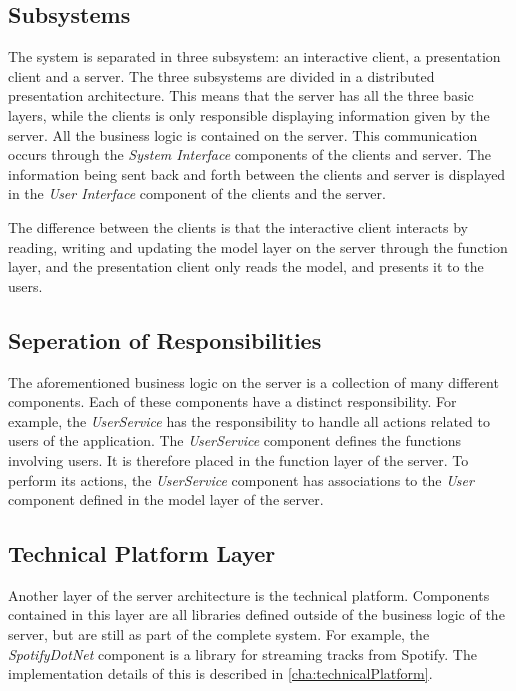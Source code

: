 \subsection{Subsystems}
The system is separated in three subsystem: an interactive client, a presentation client and a server. The three subsystems are divided in a distributed presentation architecture. This means that the server has all the three basic layers, while the clients is only responsible displaying information given by the server. All the business logic is contained on the
server. This communication occurs through the \textit{System Interface}
components of the clients and server. The information being sent back and
forth between the clients and server is displayed in the \textit{User Interface}
component of the clients and the server.

The difference between the clients is that the interactive client interacts by reading, writing and updating the model layer on the server through the function layer, and the presentation client only reads the model, and presents it to the users.

\subsection{Seperation of Responsibilities}
The aforementioned business logic on the server is a collection of
many different components. Each of these components have a distinct
responsibility. For example, the \textit{UserService} has the responsibility to
handle all actions related to users of the application. The
\textit{UserService} component defines the functions involving users. It is
therefore placed in the function layer of the server. To perform its
actions, the \textit{UserService} component has associations to the \textit{User}
component defined in the model layer of the server.

\subsection{Technical Platform Layer}

Another layer of the server architecture is the
technical platform. Components contained in this layer are all
libraries defined outside of the business logic of the server, but are
still as part of the complete system. For example, the
\textit{SpotifyDotNet} component is a library for streaming tracks from
Spotify. The implementation details of this is described in
\cref{cha:technicalPlatform}.
